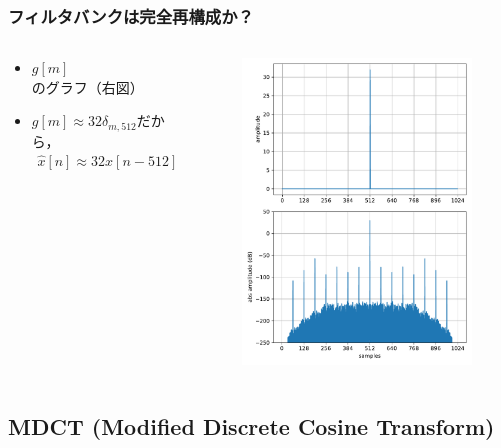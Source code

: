 \documentclass[14pt,xcolor=dvipsnames,table,dvipdfmx]{beamer}
\begin{document}
\begin{frame}[c]
    \frametitle{フィルタバンクは完全再構成か？}
    \begin{columns}
        \begin{column}{0.475\textwidth}
            \begin{itemize}
                \item $g[m]$のグラフ（右図）
                \item $g[m] \approx 32\delta_{m,512}$だから，
                    \begin{align*}
                        \hat{x}[n] \approx 32 x[n - 512]
                    \end{align*}
            \end{itemize}
        \end{column}
        \begin{column}{0.65\textwidth}
            \vspace*{-10pt}
            \begin{figure}
                \includegraphics[width=66mm]{./figs/impluse_responce_of_MP3_analysis_synthesis_filter.pdf}
            \end{figure}
        \end{column}
    \end{columns}
\end{frame}

\subsection{MDCT (Modified Discrete Cosine Transform)}
\end{document}
